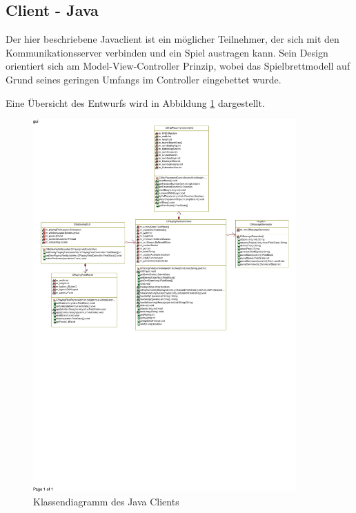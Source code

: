 \subsection{Client - Java}
\label{sec:Javaclient}

Der hier beschriebene Javaclient ist ein möglicher Teilnehmer, der sich mit den Kommunikationsserver verbinden und ein Spiel austragen kann.
Sein Design orientiert sich am Model-View-Controller Prinzip, wobei das Spielbrettmodell auf Grund seines geringen Umfangs im Controller eingebettet wurde.

Eine Übersicht des Entwurfs wird in Abbildung \ref{fig:Javaclientklassendiagramm} dargestellt.


\begin{figure}[H]
  \centering
  \includegraphics[trim=5mm 125mm 5mm 4mm,clip,width=0.9\textwidth]{images/CJavaClient.pdf}
  \caption{Klassendiagramm des Java Clients}
  \label{fig:Javaclientklassendiagramm}
\end{figure}
